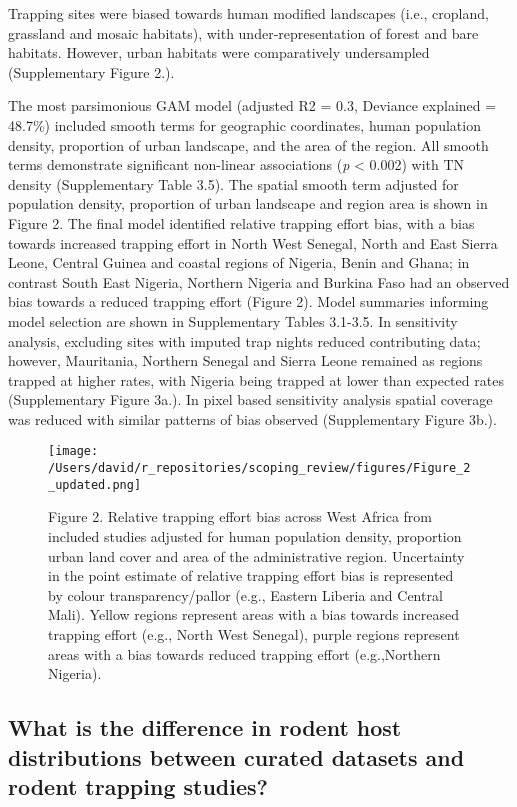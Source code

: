 \documentclass[
]{article}
\begin{document}
Trapping sites were biased towards human modified landscapes (i.e.,
cropland, grassland and mosaic habitats), with under-representation of
forest and bare habitats. However, urban habitats were comparatively
undersampled (Supplementary Figure 2.).

The most parsimonious GAM model (adjusted R2 = 0.3, Deviance explained =
48.7\%) included smooth terms for geographic coordinates, human
population density, proportion of urban landscape, and the area of the
region. All smooth terms demonstrate significant non-linear associations
(\emph{p} \textless{} 0.002) with TN density (Supplementary Table 3.5).
The spatial smooth term adjusted for population density, proportion of
urban landscape and region area is shown in Figure 2. The final model
identified relative trapping effort bias, with a bias towards increased
trapping effort in North West Senegal, North and East Sierra Leone,
Central Guinea and coastal regions of Nigeria, Benin and Ghana; in
contrast South East Nigeria, Northern Nigeria and Burkina Faso had an
observed bias towards a reduced trapping effort (Figure 2). Model
summaries informing model selection are shown in Supplementary Tables
3.1-3.5. In sensitivity analysis, excluding sites with imputed trap
nights reduced contributing data; however, Mauritania, Northern Senegal
and Sierra Leone remained as regions trapped at higher rates, with
Nigeria being trapped at lower than expected rates (Supplementary Figure
3a.). In pixel based sensitivity analysis spatial coverage was reduced
with similar patterns of bias observed (Supplementary Figure 3b.).

\begin{figure}
\centering
\texttt{[image: /Users/david/r\_repositories/scoping\_review/figures/Figure\_2\_updated.png]}
\caption{Figure 2. Relative trapping effort bias across West Africa from
included studies adjusted for human population density, proportion urban
land cover and area of the administrative region. Uncertainty in the
point estimate of relative trapping effort bias is represented by colour
transparency/pallor (e.g., Eastern Liberia and Central Mali). Yellow
regions represent areas with a bias towards increased trapping effort
(e.g., North West Senegal), purple regions represent areas with a bias
towards reduced trapping effort (e.g.,Northern Nigeria).}
\end{figure}

\hypertarget{what-is-the-difference-in-rodent-host-distributions-between-curated-datasets-and-rodent-trapping-studies-1}{%
\subsection{What is the difference in rodent host distributions between
curated datasets and rodent trapping
studies?}\label{what-is-the-difference-in-rodent-host-distributions-between-curated-datasets-and-rodent-trapping-studies-1}}
\end{document}
